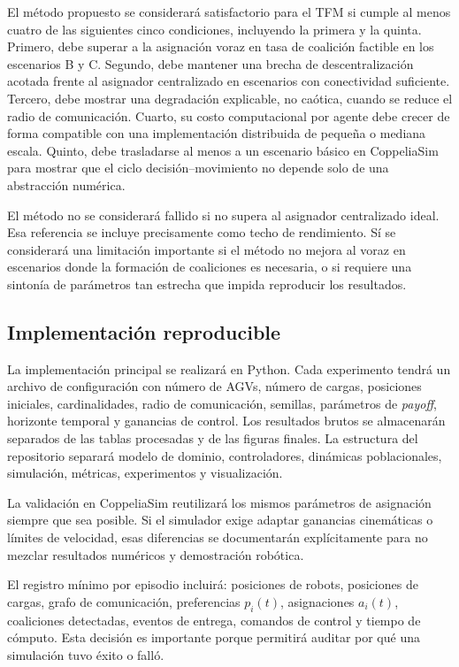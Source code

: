 \documentclass[11pt,a4paper]{article}
\begin{document}
El método propuesto se considerará satisfactorio para el TFM si cumple al menos cuatro de las siguientes cinco condiciones, incluyendo la primera y la quinta. Primero, debe superar a la asignación voraz en tasa de coalición factible en los escenarios B y C. Segundo, debe mantener una brecha de descentralización acotada frente al asignador centralizado en escenarios con conectividad suficiente. Tercero, debe mostrar una degradación explicable, no caótica, cuando se reduce el radio de comunicación. Cuarto, su costo computacional por agente debe crecer de forma compatible con una implementación distribuida de pequeña o mediana escala. Quinto, debe trasladarse al menos a un escenario básico en CoppeliaSim para mostrar que el ciclo decisión--movimiento no depende solo de una abstracción numérica.

El método no se considerará fallido si no supera al asignador centralizado ideal. Esa referencia se incluye precisamente como techo de rendimiento. Sí se considerará una limitación importante si el método no mejora al voraz en escenarios donde la formación de coaliciones es necesaria, o si requiere una sintonía de parámetros tan estrecha que impida reproducir los resultados.

\subsection{Implementación reproducible}

La implementación principal se realizará en Python. Cada experimento tendrá un archivo de configuración con número de AGVs, número de cargas, posiciones iniciales, cardinalidades, radio de comunicación, semillas, parámetros de \textit{payoff}, horizonte temporal y ganancias de control. Los resultados brutos se almacenarán separados de las tablas procesadas y de las figuras finales. La estructura del repositorio separará modelo de dominio, controladores, dinámicas poblacionales, simulación, métricas, experimentos y visualización.

La validación en CoppeliaSim reutilizará los mismos parámetros de asignación siempre que sea posible. Si el simulador exige adaptar ganancias cinemáticas o límites de velocidad, esas diferencias se documentarán explícitamente para no mezclar resultados numéricos y demostración robótica.

El registro mínimo por episodio incluirá: posiciones de robots, posiciones de cargas, grafo de comunicación, preferencias $p_i(t)$, asignaciones $a_i(t)$, coaliciones detectadas, eventos de entrega, comandos de control y tiempo de cómputo. Esta decisión es importante porque permitirá auditar por qué una simulación tuvo éxito o falló.
\end{document}
